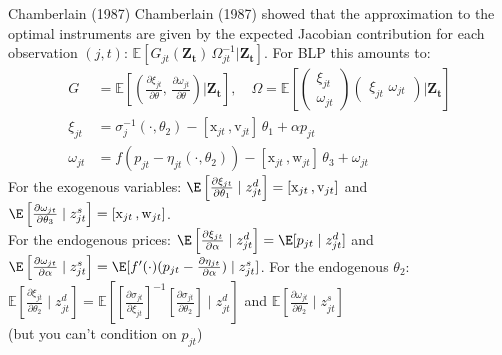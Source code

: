 \begin{frame}{Chamberlain (1987)}
Chamberlain (1987) showed that the approximation to the optimal instruments are given by the expected Jacobian contribution for each observation $(j,t)$: $\mathbb{E}[G_{jt}(\mathbf{Z_t})\, \Omega_{jt}^{-1} | \mathbf{Z_t}]$. For BLP this amounts to:
\begin{align*}
    G&=\mathbb{E}\left[
    \left(\frac{\partial \xi_{jt}}{\partial \theta}, \,
    \frac{\partial \omega_{jt}}{\partial \theta} \right)
| \mathbf{Z_t} \right], \quad 
\Omega = \mathbb{E}\left[
\begin{pmatrix}
    \xi_{jt} \\
    \omega_{jt}
\end{pmatrix}
\begin{pmatrix}
    \xi_{jt}\, \,
    \omega_{jt}
\end{pmatrix}
| \mathbf{Z_t} \right] \\
\xi_{jt} &= \sigma_j^{-1}(\cdot, \theta_2) - [\mathrm{x}_{jt} \,,  \mathrm{v}_{jt}]\, \theta_1 + \alpha p_{jt}\\
\omega_{jt} &= f\left(p_{jt}- \eta_{jt}(\cdot, \theta_2)  \right) -[\mathrm{x}_{jt} \,, \mathrm{w}_{jt}]\, \theta_3 +  \omega_{jt}
\end{align*}
For the exogenous variables: $\E\left[\frac{\partial \xi_{jt}}{\partial \theta_1} \mid  z_{jt}^{d} \right]=[\mathrm{x}_{jt} \,,  \mathrm{v}_{jt}]$ and
$\E\left[\frac{\partial \omega_{jt}}{\partial \theta_3} \mid  z_{jt}^{s} \right]=[\mathrm{x}_{jt} \,,  \mathrm{w}_{jt}]$.\\
For the endogenous prices: $\E\left[\frac{\partial \xi_{jt}}{\partial \alpha} \mid  z_{jt}^{d} \right]=\E[p_{jt} \mid z_{jt}^d]$ and
$\E\left[\frac{\partial \omega_{jt}}{\partial \alpha} \mid  z_{jt}^{s} \right]=\E[f'(\cdot) (p_{jt} - \frac{\partial \eta_{jt}}{\partial \alpha}) \mid z_{jt}^s]$.
For the endogenous $\theta_2$: $\mathbb{E}\left[\frac{\partial \xi_{jt}}{\partial \theta_2} \mid z_{jt}^d \right] 
=\mathbb{E}\left[\left[\frac{\partial \sigma_{jt}}{\partial \xi_{jt}}\right]^{-1} 
\left[\frac{\partial \sigma_{jt}}{\partial \theta_2}\right] \mid z_{jt}^d \right]$ and $\mathbb{E}\left[\frac{\partial \omega_{jt}}{\partial \theta_2} \mid z_{jt}^s \right]$\\ (but you can't condition on $p_{jt}$)
\end{frame}


